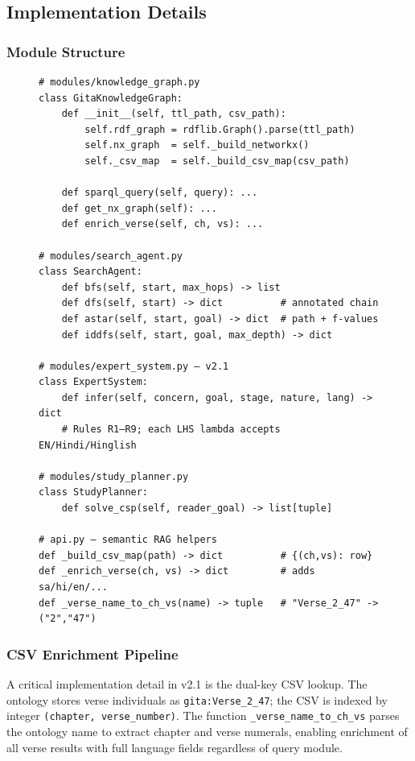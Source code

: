 \documentclass[conference]{IEEEtran}
\begin{document}
\subsection{Implementation Details}

\subsubsection{Module Structure}

\begin{figure}[!t]
\begin{lstlisting}[language=Python3, caption={Core module interfaces}]
# modules/knowledge_graph.py
class GitaKnowledgeGraph:
    def __init__(self, ttl_path, csv_path):
        self.rdf_graph = rdflib.Graph().parse(ttl_path)
        self.nx_graph  = self._build_networkx()
        self._csv_map  = self._build_csv_map(csv_path)

    def sparql_query(self, query): ...
    def get_nx_graph(self): ...
    def enrich_verse(self, ch, vs): ...

# modules/search_agent.py
class SearchAgent:
    def bfs(self, start, max_hops) -> list
    def dfs(self, start) -> dict          # annotated chain
    def astar(self, start, goal) -> dict  # path + f-values
    def iddfs(self, start, goal, max_depth) -> dict

# modules/expert_system.py — v2.1
class ExpertSystem:
    def infer(self, concern, goal, stage, nature, lang) -> dict
    # Rules R1–R9; each LHS lambda accepts EN/Hindi/Hinglish

# modules/study_planner.py
class StudyPlanner:
    def solve_csp(self, reader_goal) -> list[tuple]

# api.py — semantic RAG helpers
def _build_csv_map(path) -> dict          # {(ch,vs): row}
def _enrich_verse(ch, vs) -> dict         # adds sa/hi/en/...
def _verse_name_to_ch_vs(name) -> tuple   # "Verse_2_47" -> ("2","47")
\end{lstlisting}
\end{figure}

\subsubsection{CSV Enrichment Pipeline}

A critical implementation detail in v2.1 is the dual-key CSV lookup. The
ontology stores verse individuals as \texttt{gita:Verse\_2\_47}; the CSV is
indexed by integer \texttt{(chapter, verse\_number)}. The function
\texttt{\_verse\_name\_to\_ch\_vs} parses the ontology name to extract
chapter and verse numerals, enabling enrichment of all verse results with
full language fields regardless of query module.
\end{document}
